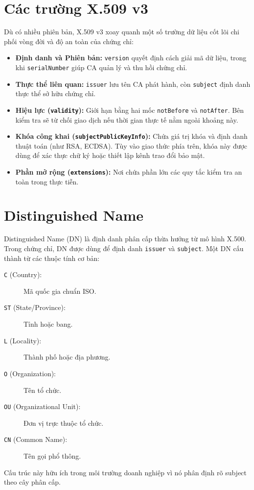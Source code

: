 \section{Các trường X.509 v3}
\label{sec:4.2}

Dù có nhiều phiên bản, X.509 v3 xoay quanh một số trường dữ liệu cốt lõi chi phối vòng đời và độ an toàn của chứng chỉ:
\begin{itemize}
    \item \textbf{Định danh và Phiên bản:} \texttt{version} quyết định cách giải mã dữ liệu, trong khi \texttt{serialNumber} giúp CA quản lý và thu hồi chứng chỉ.
    \item \textbf{Thực thể liên quan:} \texttt{issuer} lưu tên CA phát hành, còn \texttt{subject} định danh thực thể sở hữu chứng chỉ.
    \item \textbf{Hiệu lực (\texttt{validity}):} Giới hạn bằng hai mốc \texttt{notBefore} và \texttt{notAfter}. Bên kiểm tra sẽ từ chối giao dịch nếu thời gian thực tế nằm ngoài khoảng này.
    \item \textbf{Khóa công khai (\texttt{subjectPublicKeyInfo}):} Chứa giá trị khóa và định danh thuật toán (như RSA, ECDSA). Tùy vào giao thức phía trên, khóa này được dùng để xác thực chữ ký hoặc thiết lập kênh trao đổi bảo mật.
    \item \textbf{Phần mở rộng (\texttt{extensions}):} Nơi chứa phần lớn các quy tắc kiểm tra an toàn trong thực tiễn.
\end{itemize}

\section{Distinguished Name}
\label{sec:4.3}

Distinguished Name (DN) là định danh phân cấp thừa hưởng từ mô hình X.500. Trong chứng chỉ, DN được dùng để định danh \texttt{issuer} và \texttt{subject}. Một DN cấu thành từ các thuộc tính cơ bản:
\begin{description}
    \item[\texttt{C} (Country):] Mã quốc gia chuẩn ISO.
    \item[\texttt{ST} (State/Province):] Tỉnh hoặc bang.
    \item[\texttt{L} (Locality):] Thành phố hoặc địa phương.
    \item[\texttt{O} (Organization):] Tên tổ chức.
    \item[\texttt{OU} (Organizational Unit):] Đơn vị trực thuộc tổ chức.
    \item[\texttt{CN} (Common Name):] Tên gọi phổ thông.
\end{description}
Cấu trúc này hữu ích trong môi trường doanh nghiệp vì nó phân định rõ subject theo cây phân cấp.


